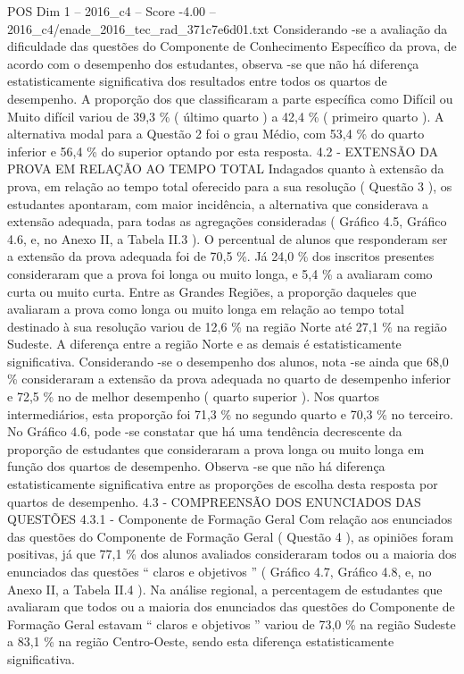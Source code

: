 \begin{textsample}{POS Dim 1 – 2016\_c4 – Score -4.00 – 2016\_c4/enade\_2016\_tec\_rad\_371c7e6d01.txt}
Considerando -se a avaliação da dificuldade das questões do Componente de Conhecimento Específico da prova, de acordo com o desempenho dos estudantes, observa -se que não há diferença estatisticamente significativa dos resultados entre todos os quartos de desempenho.
A proporção dos que classificaram a parte específica como Difícil ou Muito difícil variou de 39,3 \% ( último quarto ) a 42,4 \% ( primeiro quarto ).
A alternativa modal para a Questão 2 foi o grau Médio, com 53,4 \% do quarto inferior e 56,4 \% do superior optando por esta resposta. 4.2 - EXTENSÃO DA PROVA EM RELAÇÃO AO TEMPO TOTAL Indagados quanto à extensão da prova, em relação ao tempo total oferecido para a sua resolução ( Questão 3 ), os estudantes apontaram, com maior incidência, a alternativa que considerava a extensão adequada, para todas as agregações consideradas ( Gráfico 4.5, Gráfico 4.6, e, no Anexo II, a Tabela II.3 ).
O percentual de alunos que responderam ser a extensão da prova adequada foi de 70,5 \%.
Já 24,0 \% dos inscritos presentes consideraram que a prova foi longa ou muito longa, e 5,4 \% a avaliaram como curta ou muito curta.
Entre as Grandes Regiões, a proporção daqueles que avaliaram a prova como longa ou muito longa em relação ao tempo total destinado à sua resolução variou de 12,6 \% na região Norte até 27,1 \% na região Sudeste.
A diferença entre a região Norte e as demais é estatisticamente significativa.
Considerando -se o desempenho dos alunos, nota -se ainda que 68,0 \% consideraram a extensão da prova adequada no quarto de desempenho inferior e 72,5 \% no de melhor desempenho ( quarto superior ).
Nos quartos intermediários, esta proporção foi 71,3 \% no segundo quarto e 70,3 \% no terceiro.
No Gráfico 4.6, pode -se constatar que há uma tendência decrescente da proporção de estudantes que consideraram a prova longa ou muito longa em função dos quartos de desempenho.
Observa -se que não há diferença estatisticamente significativa entre as proporções de escolha desta resposta por quartos de desempenho. 4.3 - COMPREENSÃO DOS ENUNCIADOS DAS QUESTÕES 4.3.1 - Componente de Formação Geral Com relação aos enunciados das questões do Componente de Formação Geral ( Questão 4 ), as opiniões foram positivas, já que 77,1 \% dos alunos avaliados consideraram todos ou a maioria dos enunciados das questões “ claros e objetivos ” ( Gráfico 4.7, Gráfico 4.8, e, no Anexo II, a Tabela II.4 ).
Na análise regional, a percentagem de estudantes que avaliaram que todos ou a maioria dos enunciados das questões do Componente de Formação Geral estavam “ claros e objetivos ” variou de 73,0 \% na região Sudeste a 83,1 \% na região Centro-Oeste, sendo esta diferença estatisticamente significativa.

\end{textsample}
